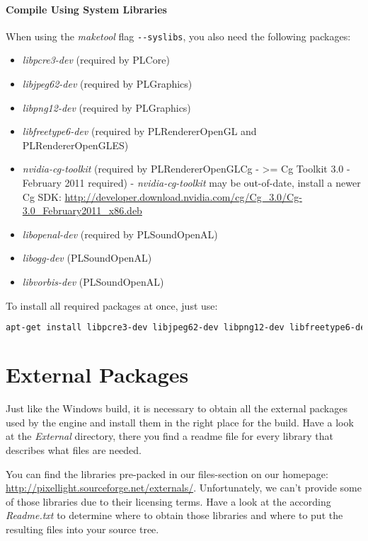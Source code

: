\paragraph{Compile Using System Libraries}
When using the \emph{maketool} flag \verb+--syslibs+, you also need the following packages:
\begin{itemize}
\item{\emph{libpcre3-dev} (required by PLCore)}
\item{\emph{libjpeg62-dev} (required by PLGraphics)}
\item{\emph{libpng12-dev} (required by PLGraphics)}
\item{\emph{libfreetype6-dev} (required by PLRendererOpenGL and PLRendererOpenGLES)}
\item{\emph{nvidia-cg-toolkit} (required by PLRendererOpenGLCg - >= Cg Toolkit 3.0 - February 2011 required) - \emph{nvidia-cg-toolkit} may be out-of-date, install a newer Cg \ac{SDK}: \url{http://developer.download.nvidia.com/cg/Cg_3.0/Cg-3.0_February2011_x86.deb}}
\item{\emph{libopenal-dev} (required by PLSoundOpenAL)}
\item{\emph{libogg-dev} (PLSoundOpenAL)}
\item{\emph{libvorbis-dev} (PLSoundOpenAL)}
\end{itemize}

To install all required packages at once, just use:
\begin{lstlisting}[language=sh]
apt-get install libpcre3-dev libjpeg62-dev libpng12-dev libfreetype6-dev libopenal-dev libogg-dev libvorbis-dev
\end{lstlisting}





\section{External Packages}
\label{Chapter:Linux_ExternalPackages}
Just like the Windows build, it is necessary to obtain all the external packages used by the engine and install them in the right place for the build. Have a look at the \emph{External} directory, there you find a readme file for every library that describes what files are needed.

You can find the libraries pre-packed in our files-section on our homepage: \url{http://pixellight.sourceforge.net/externals/}. Unfortunately, we can't provide some of those libraries due to their licensing terms. Have a look at the according \emph{Readme.txt} to determine where to obtain those libraries and where to put the resulting files into your source tree.

